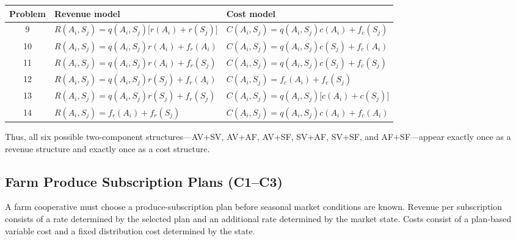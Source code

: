\begin{center}
	\small
	\begin{tabular}{cll}
		\toprule
		Problem & Revenue model & Cost model \\
		\midrule
		9
		& \(R(A_i,S_j)=q(A_i,S_j)\bigl[r(A_i)+r(S_j)\bigr]\)
		& \(C(A_i,S_j)=q(A_i,S_j)c(A_i)+f_c(S_j)\) \\
		
		10
		& \(R(A_i,S_j)=q(A_i,S_j)r(A_i)+f_r(A_i)\)
		& \(C(A_i,S_j)=q(A_i,S_j)c(S_j)+f_c(A_i)\) \\
		
		11
		& \(R(A_i,S_j)=q(A_i,S_j)r(A_i)+f_r(S_j)\)
		& \(C(A_i,S_j)=q(A_i,S_j)c(S_j)+f_c(S_j)\) \\
		
		12
		& \(R(A_i,S_j)=q(A_i,S_j)r(S_j)+f_r(A_i)\)
		& \(C(A_i,S_j)=f_c(A_i)+f_c(S_j)\) \\
		
		13
		& \(R(A_i,S_j)=q(A_i,S_j)r(S_j)+f_r(S_j)\)
		& \(C(A_i,S_j)=q(A_i,S_j)\bigl[c(A_i)+c(S_j)\bigr]\) \\
		
		14
		& \(R(A_i,S_j)=f_r(A_i)+f_r(S_j)\)
		& \(C(A_i,S_j)=q(A_i,S_j)c(A_i)+f_c(A_i)\) \\
		\bottomrule
	\end{tabular}
\end{center}

Thus, all six possible two-component structures---AV+SV, AV+AF,
AV+SF, SV+AF, SV+SF, and AF+SF---appear exactly once as a revenue
structure and exactly once as a cost structure.

\subsection{Farm Produce Subscription Plans (C1--C3)}
\label{sec:problem9-farm-produce-subscription-c1-c3}

A farm cooperative must choose a produce-subscription plan before seasonal
market conditions are known. Revenue per subscription consists of a rate
determined by the selected plan and an additional rate determined by the
market state. Costs consist of a plan-based variable cost and a fixed
distribution cost determined by the state.

